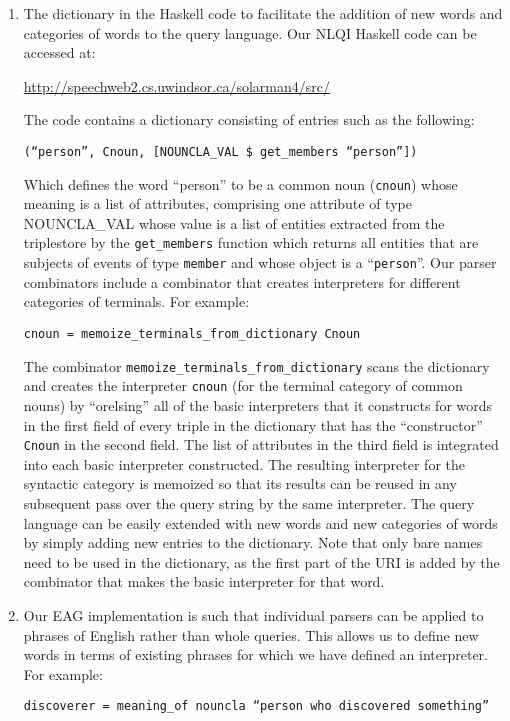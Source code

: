 \documentclass[../main.tex]{subfiles}
\begin{document}
\begin{refsection}
\begin{enumerate}
	\item The dictionary in the Haskell code to facilitate the addition of new words and
	categories of words to the query language. Our NLQI Haskell code can be accessed at:
	\begin{center} \url{http://speechweb2.cs.uwindsor.ca/solarman4/src/} \end{center}
	The code contains a dictionary consisting of entries such as the following:
	\begin{center} \texttt{(``person'', Cnoun, [NOUNCLA\_VAL \$ get\_members ``person''])} \end{center}
	Which defines the word ``person'' to be a common noun (\texttt{cnoun}) whose meaning is a
	list of attributes, comprising one attribute of type NOUNCLA\_VAL whose value is a list of
	entities extracted from the triplestore by the \texttt{get\_members} function which returns all entities
	that are subjects of events of type \texttt{member} and whose object is a ``\texttt{person}''. Our parser
	combinators include a combinator that creates interpreters for different categories of terminals.
	For example:
	\begin{center} \texttt{cnoun = memoize\_terminals\_from\_dictionary Cnoun} \end{center}
	The combinator \texttt{memoize\_terminals\_from\_dictionary} scans the dictionary and
	creates the interpreter \texttt{cnoun} (for the terminal category of common nouns) by ``orelsing''
	all of the basic interpreters that it constructs for words in the first field of every triple in the
	dictionary that has the ``constructor'' \texttt{Cnoun} in the second field. The list of attributes in the
	third field is integrated into each basic interpreter constructed. The resulting interpreter for the
	syntactic category is memoized so that its results can be reused in any subsequent pass over the
	query string by the same interpreter.
	The query language can be easily extended with new words and new categories of words by
	simply adding new entries to the dictionary.
	Note that only bare names need to be used in the dictionary, as the first part of the URI is added
	by the combinator that makes the basic interpreter for that word.
	\item Our EAG implementation is such that individual parsers can be applied to phrases of English
	rather than whole queries. This allows us to define new words in terms of existing phrases for
	which we have defined an interpreter. For example:
	\begin{center} \texttt{discoverer = meaning\_of nouncla ``person who discovered something''} \end{center}
	

\end{enumerate}
\end{refsection}
\end{document}
